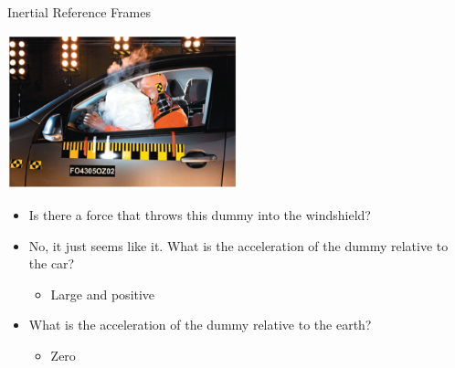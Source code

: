 \documentclass{beamer}
\begin{document}
\begin{frame}{Inertial Reference Frames}
\begin{center}
   \includegraphics[width=0.5\textwidth]{../figures/05_Pg122_UnFigure.jpg}
\end{center}
\begin{itemize}
   \item Is there a force that throws this dummy into the windshield?
   \item<2-> No, it just seems like it. What is the acceleration of the dummy relative to the car?
   \begin{itemize}
      \item<3-> Large and positive
   \end{itemize}
   \item<4-> What is the acceleration of the dummy relative to the earth?
   \begin{itemize}
      \item<5-> Zero
   \end{itemize}
\end{itemize}
\end{frame}
\end{document}
